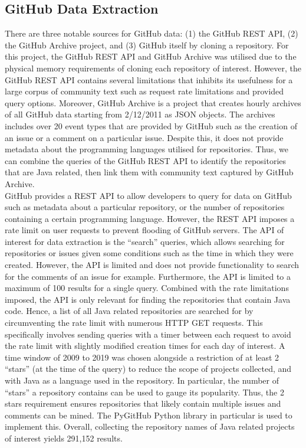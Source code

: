 \subsection{GitHub Data Extraction}
\label{subsec:info-github-extract}
There are three notable sources for GitHub data: (1) the GitHub REST API, (2) the GitHub Archive project, and (3) GitHub itself by cloning a repository. For this project, the GitHub REST API and GitHub Archive was utilised due to the physical memory requirements of cloning each repository of interest. However, the GitHub REST API contains several limitations that inhibits its usefulness for a large corpus of community text such as request rate limitations and provided query options. Moreover, GitHub Archive is a project that creates hourly archives of all GitHub data starting from 2/12/2011 as JSON objects. The archives includes over 20 event types that are provided by GitHub such as the creation of an issue or a comment on a particular issue. Despite this, it does not provide metadata about the programming languages utilised for repositories. Thus, we can combine the queries of the GitHub REST API to identify the repositories that are Java related, then link them with community text captured by GitHub Archive.\\ 

GitHub provides a REST API to allow developers to query for data on GitHub such as metadata about a particular repository, or the number of repositories containing a certain programming language. However, the REST API imposes a rate limit on user requests to prevent flooding of GitHub servers. The API of interest for data extraction is the ``search'' queries, which allows searching for repositories or issues given some conditions such as the time in which they were created. However, the API is limited and does not provide functionality to search for the comments of an issue for example. Furthermore, the API is limited to a maximum of 100 results for a single query. Combined with the rate limitations imposed, the API is only relevant for finding the repositories that contain Java code. Hence, a list of all Java related repositories are searched for by circumventing the rate limit with numerous HTTP GET requests. This specifically involves sending queries with a timer between each request to avoid the rate limit with slightly modified creation times for each day of interest. A time window of 2009 to 2019 was chosen alongside a restriction of at least 2 ``stars'' (at the time of the query) to reduce the scope of projects collected, and with Java as a language used in the repository. In particular, the number of ``stars'' a repository contains can be used to gauge its popularity. Thus, the 2 stars requirement ensures repositories that likely contain multiple issues and comments can be mined. The PyGitHub Python library in particular is used to implement this. Overall, collecting the repository names of Java related projects of interest yields 291,152 results. \\


